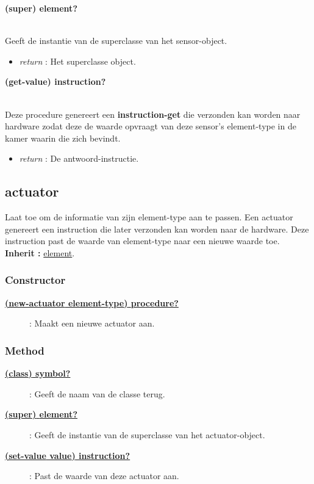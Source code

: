 \documentclass{article}
\newcommand{\ar}{\ding{213} }
\newcommand{\code}[1]{\textcolor{code}{#1}}
\newcommand{\lb}[1][]{\code{(#1}}
\newcommand{\rb}{\code{)}}
\newcommand{\racket}[1]{
	{\color{blue}\textbf{#1}}
}
\begin{document}
\begin{framed}
\hypertarget{sensor:super}{\racket{\lb[super]\rb \ar \code{element?}}}
\\Geeft de instantie van de superclasse van het sensor-object.
\begin{itemize}
	\item \emph{return} : Het superclasse object.
\end{itemize}
\end{framed}

\begin{framed}
\hypertarget{sensor:get-value}{\racket{\lb[get-value]\rb \ar \code{instruction?}}}
\\Deze procedure genereert een \racket{instruction-get} die verzonden kan worden naar hardware zodat deze de waarde opvraagt van deze sensor's element-type in de kamer waarin die zich bevindt.
\begin{itemize}
	\item \emph{return} : De antwoord-instructie.
\end{itemize}
\end{framed}

\newpage
\hypertarget{actuator}{\subsection{actuator}}
Laat toe om de informatie van zijn element-type aan te passen. Een actuator genereert een instruction die later verzonden kan worden naar de hardware. Deze instruction past de waarde van element-type naar een nieuwe waarde toe.
\\\textbf{Inherit :} \hyperlink{element}{element}.

\subsubsection{Constructor}
\begin{description}
\item[\hyperlink{actuator:new-actuator}{\racket{\lb[new-actuator] element-type\rb \ar \code{procedure?}}}] : Maakt een nieuwe actuator aan.
\end{description}

\subsubsection{Method}
\begin{description}
\item[\hyperlink{actuator:class}{\racket{\lb[class]\rb \ar \code{symbol?}}}] : Geeft de naam van de classe terug.
\item[\hyperlink{actuator:super}{\racket{\lb[super]\rb \ar \code{element?}}}] : Geeft de instantie van de superclasse van het actuator-object.
\item[\hyperlink{actuator:set-value}{\racket{\lb[set-value] value\rb \ar \code{instruction?}}}] : Past de waarde van deze actuator aan.
\end{description}
\end{document}
